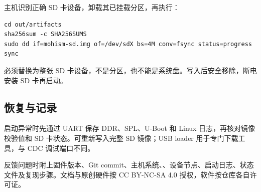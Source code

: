 主机识别正确 SD 卡设备，卸载其已挂载分区，再执行：
\begin{lstlisting}
cd out/artifacts
sha256sum -c SHA256SUMS
sudo dd if=mohism-sd.img of=/dev/sdX bs=4M conv=fsync status=progress
sync
\end{lstlisting}
 必须替换为整张 SD 卡设备，不是分区，也不能是系统盘。写入后安全移除，断电安装 SD 卡再启动。

\subsection{恢复与记录}
启动异常时先通过 UART 保存 DDR、SPL、U-Boot 和 Linux 日志，再核对镜像校验值和 SD 卡状态。可重新写入完整 SD 镜像；USB loader 用于专门下载工具，与 CDC 调试端口不同。

反馈问题时附上固件版本、Git commit、主机系统、、设备节点、启动日志、状态文件及复现步骤。文档与原创硬件按 CC BY-NC-SA 4.0 授权，软件按仓库各自许可证。

